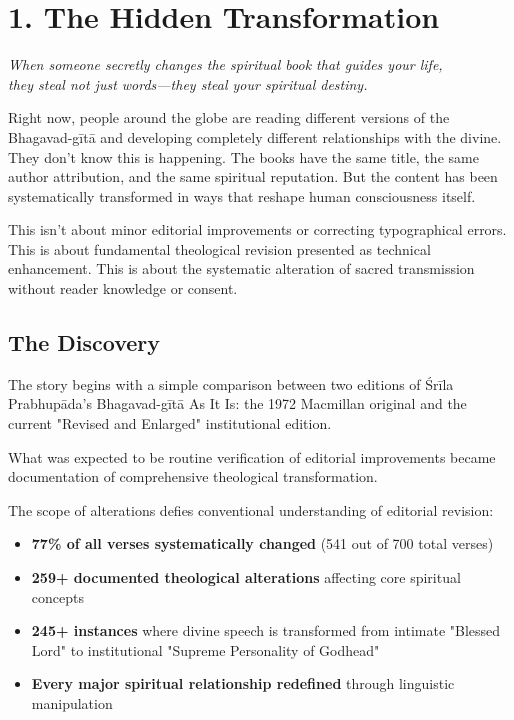 \documentclass[11pt,twoside]{book}
\begin{document}
\chapter*{1. The Hidden Transformation}
\label{sec:orgc56a9d1}

{\centering\itshape When someone secretly changes the spiritual book that guides your life,\\they steal not just words—they steal your spiritual destiny.\par}
\vspace{0.3cm}

\normalfont\justifying
Right now, people around the globe are reading different versions of the Bhagavad-gītā and developing completely different relationships with the divine. They don't know this is happening. The books have the same title, the same author attribution, and the same spiritual reputation. But the content has been systematically transformed in ways that reshape human consciousness itself.

This isn't about minor editorial improvements or correcting typographical errors. This is about fundamental theological revision presented as technical enhancement. This is about the systematic alteration of sacred transmission without reader knowledge or consent.
\section*{The Discovery}
\label{sec:org292cc27}

The story begins with a simple comparison between two editions of Śrīla Prabhupāda's Bhagavad-gītā As It Is: the 1972 Macmillan original and the current "Revised and Enlarged" institutional edition. 

What was expected to be routine verification of editorial improvements became documentation of comprehensive theological transformation.

The scope of alterations defies conventional understanding of editorial revision:

\setlength{\leftmargini}{1em}
\begin{itemize}
\item \textbf{\textbf{77\% of all verses systematically changed}} (541 out of 700 total verses)
\item \textbf{\textbf{259+ documented theological alterations}} affecting core spiritual concepts
\item \textbf{\textbf{245+ instances}} where divine speech is transformed from intimate "Blessed Lord" to institutional "Supreme Personality of Godhead"
\item \textbf{\textbf{Every major spiritual relationship redefined}} through linguistic manipulation
\end{itemize}
\end{document}
